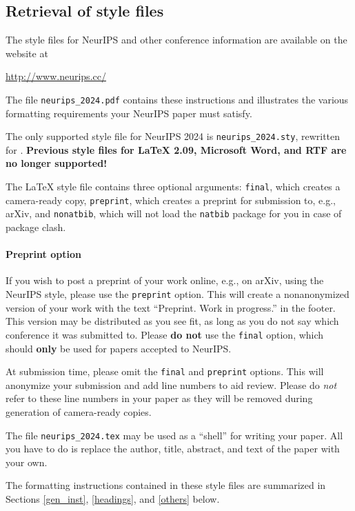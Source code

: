 \documentclass{article}
\begin{document}
\subsection{Retrieval of style files}


The style files for NeurIPS and other conference information are available on
the website at
\begin{center}
  \url{http://www.neurips.cc/}
\end{center}
The file \verb+neurips_2024.pdf+ contains these instructions and illustrates the
various formatting requirements your NeurIPS paper must satisfy.


The only supported style file for NeurIPS 2024 is \verb+neurips_2024.sty+,
rewritten for \LaTeXe{}.  \textbf{Previous style files for \LaTeX{} 2.09,
  Microsoft Word, and RTF are no longer supported!}


The \LaTeX{} style file contains three optional arguments: \verb+final+, which
creates a camera-ready copy, \verb+preprint+, which creates a preprint for
submission to, e.g., arXiv, and \verb+nonatbib+, which will not load the
\verb+natbib+ package for you in case of package clash.


\paragraph{Preprint option}
If you wish to post a preprint of your work online, e.g., on arXiv, using the
NeurIPS style, please use the \verb+preprint+ option. This will create a
nonanonymized version of your work with the text ``Preprint. Work in progress.''
in the footer. This version may be distributed as you see fit, as long as you do not say which conference it was submitted to. Please \textbf{do
  not} use the \verb+final+ option, which should \textbf{only} be used for
papers accepted to NeurIPS.


At submission time, please omit the \verb+final+ and \verb+preprint+
options. This will anonymize your submission and add line numbers to aid
review. Please do \emph{not} refer to these line numbers in your paper as they
will be removed during generation of camera-ready copies.


The file \verb+neurips_2024.tex+ may be used as a ``shell'' for writing your
paper. All you have to do is replace the author, title, abstract, and text of
the paper with your own.


The formatting instructions contained in these style files are summarized in
Sections \ref{gen_inst}, \ref{headings}, and \ref{others} below.
\end{document}
